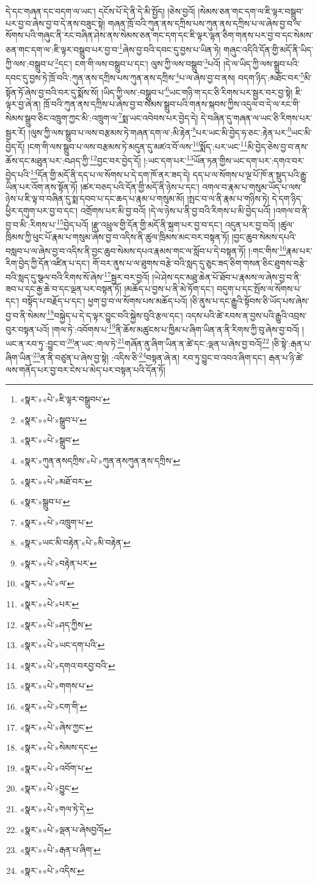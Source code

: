དེ་དང་གཞན་དང་བདག་ལ་ཡང་། དངོས་པོ་དེ་ནི་དེ་མི་སྤྱོད། །ཅེས་བྱའོ། །སེམས་ཅན་གང་དག་ལ་ཇི་ལྟར་བསྒྲུབ་པར་བྱ་བ་ཞེས་བྱ་བ་དེ་ནས་བཟུང་སྟེ། གཞན་ཁྲོ་བའི་ཀུན་ནས་དཀྲིས་པས་ཀུན་ནས་དཀྲིས་པ་ལ་ཞེས་བྱ་བ་ལ་སོགས་པའི་གཞུང་ནི་རང་བཞིན་ཤེས་ནས་སེམས་ཅན་གང་དག་དང་ཇི་ལྟར་ལྷན་ཅིག་གནས་པར་བྱ་བ་དང་སེམས་ཅན་གང་དག་ལ་:ཇི་ལྟར་བསྒྲུབ་པར་བྱ་བ་\footnote{«སྣར་»«པེ་»ཇི་ལྟར་བསྒྲུབཔ་}ཞེས་བྱ་བའི་དབང་དུ་བྱས་པ་ཡིན་ཏེ། གཞུང་འདིའི་དོན་གྱི་མདོ་ནི་ཡིད་ཀྱི་ལས་:བསྒྲུབ་པ་\footnote{«སྣར་»«པེ་»སྒྲུབ་པ་}དང་། ངག་གི་ལས་བསྒྲུབ་པ་དང་། ལུས་ཀྱི་ལས་བསྒྲུབ་\footnote{«སྣར་»«པེ་»སྒྲུབ་}པའོ། །དེ་ལ་ཡིད་ཀྱི་ལས་སྒྲུབ་པའི་དབང་དུ་བྱས་ཏེ་ཁྲོ་བའི་:ཀུན་ནས་དཀྲིས་པས་ཀུན་ནས་དཀྲིས་\footnote{«སྣར་»ཀུན་ནསདཀྲིས་«པེ་»ཀུན་ནསཀུན་ནས་དཀྲིས་}པ་ལ་ཞེས་བྱ་བ་ནས། བདག་ཉིད་:མཐོང་བར་\footnote{«སྣར་»«པེ་»མཐོ་བར་}མི་སྟོན་ཏོ་ཞེས་བྱ་བའི་བར་དུ་སྨོས་སོ། །ཡིད་ཀྱི་ལས་:བསྒྲུབ་པ་\footnote{«སྣར་»སྒྲུབ་པ་}ཡང་གཉི་ག་དང་ཅི་རིགས་པར་སྦྱར་བར་བྱ་སྟེ། ཇི་ལྟར་བྱ་ཞེ་ན། ཁྲོ་བའི་ཀུན་ནས་དཀྲིས་པ་ཞེས་བྱ་བ་སེམས་སྒྲུབ་པའི་གནས་སྐབས་ཀྱིས་འདུལ་བ་དེ་ལ་རང་གི་སེམས་སྒྲུབ་ཅིང་འཁྲུག་ཀྱང་མི་:འཁྲུག་ལ་\footnote{«སྣར་»«པེ་»འཁྲུག་པ་}སྨ་ཡང་འབེབས་པར་བྱེད་དེ། དེ་བཞིན་དུ་གཞན་ལ་ཡང་ཅི་རིགས་པར་སྦྱར་རོ། །ལུས་ཀྱི་ལས་སྒྲུབ་པ་ལས་བརྩམས་ཏེ་གཞན་དག་ལ་:མི་རྟེན་\footnote{«སྣར་»ཡང་མི་བརྟེན་«པེ་»མི་བརྟེན་}པར་ཡང་མི་བྱེད་ཧ་ཅང་:རྟེན་པར་\footnote{«སྣར་»«པེ་»བརྟེན་པར་}ཡང་མི་བྱེད་དོ། །ངག་གི་ལས་སྒྲུབ་པ་ལས་བརྩམས་ཏེ་མདུན་དུ་མཛའ་བོ་ལས་\footnote{«སྣར་»«པེ་»ལ་}སྨོད་:པར་ཡང་\footnote{«སྣར་»«པེ་»པར་}མི་བྱེད་ཅེས་བྱ་བ་ནས་ཆོས་དང་མཐུན་པར་:བཤད་ཀྱི་\footnote{«སྣར་»«པེ་»ཤད་ཀྱིས་}བྱང་བར་བྱེད་དོ། །:ཡང་དག་པར་\footnote{«སྣར་»«པེ་»ཡང་དག་པའི་}ཡོན་ཏན་གྱིས་ཡང་དག་པར་:དགའ་བར་བྱེད་པའི་\footnote{«སྣར་»«པེ་»དགའ་བརབྱ་བའི་}དོན་གྱི་མདོ་ནི་དད་པ་ལ་སོགས་པ་དེ་དག་ཁོ་ནར་ཟད་དེ། དད་པ་ལ་སོགས་པ་ལྔ་པོ་ཁོ་ན་སྡུད་པའི་རྒྱུ་ཡིན་པར་འོག་ནས་སྟོན་ཏོ། །ཚར་བཅད་པའི་དོན་གྱི་མདོ་ནི་ཉེས་པ་དང་། འགལ་བ་རྣམ་པ་གསུམ་ཡོད་པ་ལས་ཉེས་པ་ཇི་ལྟ་བ་བཞིན་དུ་སྨ་དབབ་པ་དང་ཆད་པ་རྣམ་པ་གསུམ་མོ། །སྤང་བ་ལ་ནི་རྣམ་པ་གཉིས་ཏེ། དེ་དག་ཉིད་ཕྱིར་དགུག་པར་བྱ་བ་དང་། འགྲོགས་པར་མི་བྱ་བའོ། །དེ་ལ་ཉེས་པ་ནི་བྱ་བའི་རིགས་པ་མི་བྱེད་པའོ། །འགལ་བ་ནི་བྱ་བ་མི་:རིགས་པ་\footnote{«སྣར་»«པེ་»གགས་པ་}བྱེད་པའོ། །རྫུ་འཕྲུལ་གྱི་དོན་གྱི་མདོ་ནི་སྐྲག་པར་བྱ་བ་དང་། འདུན་པར་བྱ་བའོ། །ཚུལ་ཁྲིམས་ཀྱི་ཕུང་པོ་རྣམ་པ་གསུམ་ཞེས་བྱ་བ་འདིས་ནི་ཚུལ་ཁྲིམས་མང་བར་བསྟན་ཏོ། །བྱང་ཆུབ་སེམས་དཔའི་བསླབ་པ་ལ་ཞེས་བྱ་བ་འདིས་ནི་བྱང་ཆུབ་སེམས་དཔའ་རྣམས་གང་ལ་སློབ་པ་དེ་བསྟན་ཏོ། །:གང་གིས་\footnote{«སྣར་»«པེ་»ངག་གི་}རྣམ་པར་རིག་བྱེད་ཀྱི་དོན་འཛིན་པ་དང་། གོ་བར་ནུས་པ་ལ་ཐུགས་བརྩེ་བའི་སླད་དུ་ཅུང་ཟད་ཅིག་གསན་ཅིང་ཐུགས་བརྩེ་བའི་སླད་དུ་སྩལ་བའི་རིགས་སོ་ཞེས་\footnote{«སྣར་»«པེ་»ཞེས་ཀྱང་}སྦྱར་བར་བྱའོ། །ཡེ་ཤེས་དང་མཐུ་ཆེན་པོ་ཐོབ་པ་རྣམས་ལ་ཞེས་བྱ་བ་ནི་ཟབ་པ་དང་རྒྱ་ཆེ་བ་དང་ལྡན་པར་བསྟན་ཏོ། །མཆོད་པ་བྱས་པ་ནི་མེ་ཏོག་དང་། བདུག་པ་དང་སྤོས་ལ་སོགས་པ་དང་། བསྟོད་པ་བརྗོད་པ་དང་། ཕྱག་བྱ་བ་ལ་སོགས་པས་མཆོད་པའོ། །ཅི་ནུས་པ་དང་རྒྱུའི་སྟོབས་ཅི་ཡོད་པས་ཞེས་བྱ་བ་ནི་སེམས་\footnote{«སྣར་»«པེ་»སེམས་དང་}བསྐྱེད་པ་དེ་ད་ལྟར་བྱུང་བའི་སྐྱེས་བུའི་རྩལ་དང་། འདས་པའི་ཚེ་རབས་ན་བྱས་པའི་རྒྱུའི་འབྲས་བུར་བསྟན་པའོ། །གལ་ཏེ་:འབོགས་པ་\footnote{«སྣར་»«པེ་»འབོག་པ་}ནི་ཆོས་མཚུངས་པ་ཁྱིམ་པ་ཞིག་ཡིན་ན་ནི་རིགས་ཀྱི་བུ་ཞེས་བྱ་བའོ། །ཡང་ན་རབ་ཏུ་:བྱུང་བ་\footnote{«སྣར་»«པེ་»བྱུང་}ན་ཡང་:གལ་ཏེ་\footnote{«སྣར་»«པེ་»གལ་ཏེ་དེ་}གཞོན་ནུ་ཞིག་ཡིན་ན་ཚེ་དང་:ལྡན་པ་ཞེས་བྱ་བའོ།\footnote{«སྣར་»«པེ་»ལྡན་པ་ཞེསབྱའོ།} །ཅི་སྟེ་:རྒན་པ་ཞིག་ཡིན་\footnote{«སྣར་»«པེ་»རྒན་པ་ཞིག་}ན་ནི་བཙུན་པ་ཞེས་བྱ་སྟེ། :འདིས་ཅི་\footnote{«སྣར་»«པེ་»འདིས་}བསྟན་ཞེ་ན། རབ་ཏུ་བྱུང་བ་འབའ་ཞིག་དང་། རྒན་པ་ཉི་ཚེ་ལས་གནོད་པར་བྱ་བར་ངེས་པ་མེད་པར་བསྟན་པའི་དོན་ཏོ། 